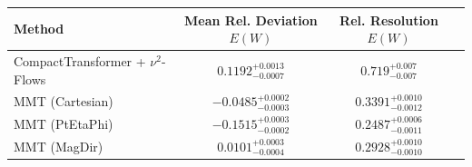     \begin{tabular}{lccc}
        \toprule
        Method & Mean Rel. Deviation $E(W)$ & Rel. Resolution $E(W)$ \\
        \midrule
        CompactTransformer + $\nu^2$-Flows & $0.1192^{+0.0013}_{-0.0007}$ & $0.719^{+0.007}_{-0.007}$ \\
        MMT (Cartesian) & $-0.0485^{+0.0002}_{-0.0003}$ & $0.3391^{+0.0010}_{-0.0012}$ \\
        MMT (PtEtaPhi) & $-0.1515^{+0.0003}_{-0.0002}$ & $0.2487^{+0.0006}_{-0.0011}$ \\
        MMT (MagDir) & $0.0101^{+0.0003}_{-0.0004}$ & $0.2928^{+0.0010}_{-0.0010}$ \\
        \bottomrule
    \end{tabular}